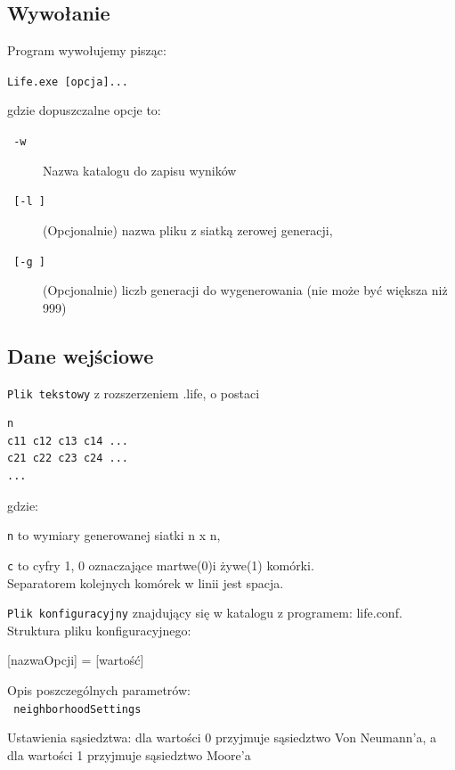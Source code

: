 \documentclass[a4paper,12pt,twoside]{article}
\newcommand{\prog}{\texttt}
\begin{document}
\subsection{Wywołanie}

Program wywołujemy pisząc:
\medskip

   \quad \prog{Life.exe [opcja]...} 

   gdzie dopuszczalne opcje to:

\begin{description}
\item[\prog{ -w }] Nazwa katalogu do zapisu wyników


\item[\prog{ [-l ]}] (Opcjonalnie) nazwa pliku z siatką zerowej generacji,

\item[\prog{ [-g ]}] (Opcjonalnie) liczb generacji do wygenerowania (nie może być większa niż 999)
  
\end{description}

\subsection{Dane wejściowe}


   \verb+Plik tekstowy+ z rozszerzeniem .life, o postaci
\begin{verbatim}
n
c11 c12 c13 c14 ...
c21 c22 c23 c24 ...
... 
\end{verbatim} 
   gdzie:
   
    \verb+n+ to wymiary generowanej siatki n x n,
    
    \verb+c+ to cyfry 1, 0 oznaczające martwe(0)i żywe(1) komórki.\\
   Separatorem kolejnych komórek w linii jest spacja.
  
   \verb+Plik konfiguracyjny+ znajdujący się w katalogu z programem: life.conf. \\
   Struktura pliku konfiguracyjnego: 
  \begin{center}  
   [nazwaOpcji] = [wartość] 
  \end{center}
  
  Opis poszczególnych parametrów: \\  
  \prog{ neighborhoodSettings } 
  
  \hspace{1.5cm} Ustawienia sąsiedztwa: dla wartości 0 przyjmuje sąsiedztwo Von Neumann'a, a dla wartości 1 przyjmuje sąsiedztwo Moore'a
  
\end{document}
